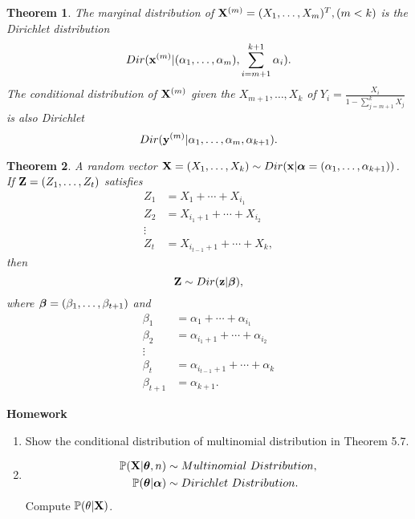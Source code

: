 \documentclass[11pt]{article}
\def\BP{{\bf P}}
\def\X{{\bf X}}
\def\x{{\bf x}}
\def\y{{\bf y}}
\def\Z{{\bf Z}}
\def\z{{\bf z}}
\def\BP{{\mathbb P}}
\def\tha{\mbox{\boldmath$\theta$\unboldmath}}
\def\aph{\mbox{\boldmath$\alpha$\unboldmath}}
\def\bt{\mbox{\boldmath$\beta$\unboldmath}}
\newtheorem{theorem}{Theorem}[section]
\begin{document}
\begin{theorem}
	The marginal distribution of $\X^{(m)}=(X_1,\dots,X_m)^T, (m<k)$ is the Dirichlet distribution
		$$Dir(\x^{(m)}|(\alpha_1,\dots,\alpha_m),\sum_{i=m+1}^{k+1}\alpha_i).$$
	The conditional distribution of $\X^{(m)}$ given the $X_{m+1},\dots,X_k$ of $Y_i = \frac{X_i}{1-\sum_{j=m+1}^k X_j}$ is also Dirichlet 
		$$Dir(\y^{(m)}|\alpha_1,\dots, \alpha_m,\alpha_{k+1}).$$
\end{theorem}

\begin{theorem}
	A random vector $\X=(X_1,\dots,X_k) \sim Dir(\x|\aph=(\alpha_1,\dots,\alpha_{k+1}))$. If $\Z=(Z_1,\dots,Z_t)$ satisfies 
	\begin{align}
		Z_1&=X_1+\cdots+X_{i_1}\\
		Z_2&=X_{i_1+1}+\cdots +X_{i_2}\\
		\vdots\\
		Z_t&=X_{i_{t-1}+1}+\cdots +X_k,
	\end{align}
	then 
		$$\Z \sim Dir(\z|\bt),$$
	where $\bt=(\beta_1,\dots,\beta_{t+1})$ and
		\begin{align*}
			\beta_1 &= \alpha_1+\cdots+\alpha_{i_1}\\
			\beta_2 &= \alpha_{i_1+1}+\cdots+\alpha_{i_2}\\
			\vdots\\
			\beta_t&= \alpha_{i_{t-1}+1}+\cdots +\alpha_k\\
			\beta_{t+1} &= \alpha_{k+1}.
		\end{align*}
\end{theorem}

{\bf Homework}
\begin{enumerate}
\item
Show the conditional distribution of multinomial distribution in Theorem 5.7.
\item
\begin{align*}
	\BP(\X|\tha,n)		&\sim Multinomial\ Distribution,\\
	\BP(\tha|\aph) 	&\sim Dirichlet\ Distribution.
\end{align*}
Compute $\BP(\theta|\X)$.
\end{enumerate}
\end{document}
